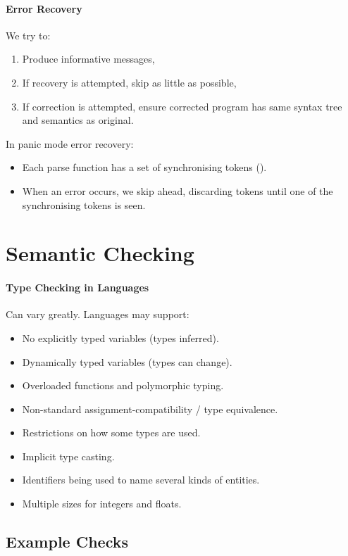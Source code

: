 \documentclass[twocolumn,english]{article}
\let\emph\relax
\begin{document}
\paragraph{Error Recovery}

We try to:
\begin{enumerate}
\item Produce informative messages,
\item If recovery is attempted, skip as little as possible,
\item If correction is attempted, ensure corrected program has same syntax
tree and semantics as original.
\end{enumerate}
In panic mode error recovery:
\begin{itemize}
\item Each parse function has a set of synchronising tokens (\emph{syncset}).
\item When an error occurs, we skip ahead, discarding tokens until one of
the synchronising tokens is seen.
\end{itemize}

\section{Semantic Checking}

\paragraph{Type Checking in Languages}

Can vary greatly. Languages may support:
\begin{itemize}
\item No explicitly typed variables (types inferred).
\item Dynamically typed variables (types can change).
\item Overloaded functions and polymorphic typing.
\item Non-standard assignment-compatibility / type equivalence.
\item Restrictions on how some types are used.
\item Implicit type casting.
\item Identifiers being used to name several kinds of entities.
\item Multiple sizes for integers and floats.
\end{itemize}

\subsection{Example Checks}
\end{document}
